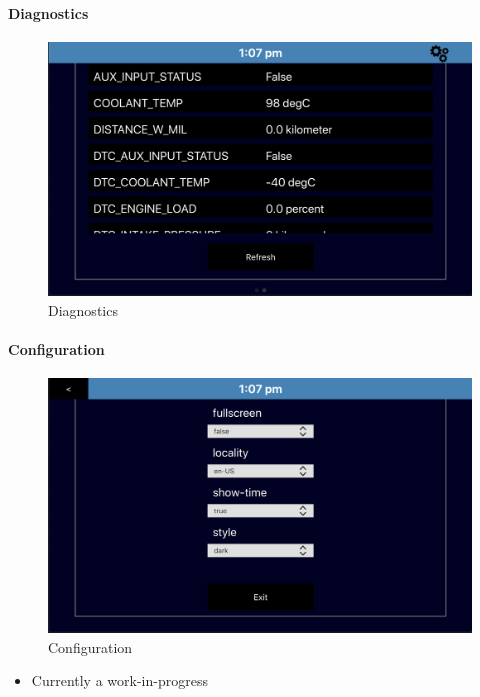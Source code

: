 \documentclass{article}
\begin{document}
\hypertarget{diagnostics}{%
\paragraph{Diagnostics}\label{diagnostics}}

\begin{figure}
\centering
\includegraphics{./resources/diagnostics.png}
\caption{Diagnostics}
\end{figure}

\hypertarget{configuration}{%
\paragraph{Configuration}\label{configuration}}

\begin{figure}
\centering
\includegraphics{./resources/configuration.png}
\caption{Configuration}
\end{figure}

\begin{itemize}
\tightlist
\item
  Currently a work-in-progress
\end{itemize}
\end{document}
